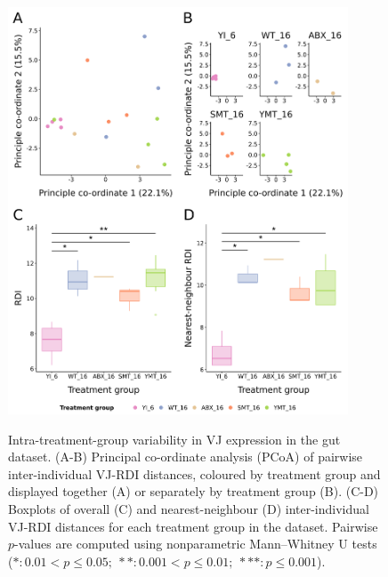 \begin{figure}
\centering
\includegraphics[width = 0.9\textwidth]{_Figures/png/igseq-gut-rdi-VJ-individual-group}
\begin{subfigure}{0em}
\label{fig:igseq-gut-rdi-VJ-individual-group-pcoa-all}
\end{subfigure}
\begin{subfigure}{0em}
\label{fig:igseq-gut-rdi-VJ-individual-group-pcoa-facet}
\end{subfigure}
\begin{subfigure}{0em}
\label{fig:igseq-gut-rdi-VJ-individual-group-groupdist-all}
\end{subfigure}
\begin{subfigure}{0em}
\label{fig:igseq-gut-rdi-VJ-individual-group-groupdist-nn}
\end{subfigure}
\caption{Intra-treatment-group variability in VJ expression in the \igseq gut dataset. (A-B) Principal co-ordinate analysis (PCoA) of pairwise inter-individual VJ-RDI distances, coloured by treatment group and displayed together (A) or separately by treatment group (B). (C-D) Boxplots of overall (C) and nearest-neighbour (D) inter-individual VJ-RDI distances for each treatment group in the dataset. Pairwise $p$-values are computed using nonparametric Mann–Whitney U tests ($*: 0.01 < p \leq 0.05;~**: 0.001 < p \leq 0.01;~***: p \leq 0.001$).}
\label{fig:igseq-gut-rdi-VJ-individual-group}
\end{figure}

